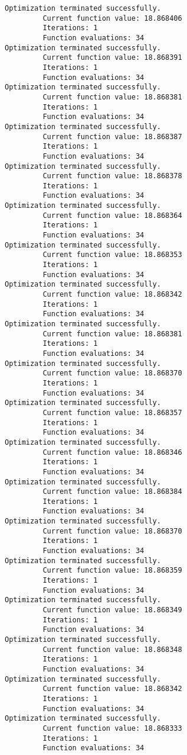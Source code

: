 \documentclass[11pt]{article}
\begin{document}
\begin{Verbatim}[commandchars=\\\{\}]
Optimization terminated successfully.
         Current function value: 18.868406
         Iterations: 1
         Function evaluations: 34
Optimization terminated successfully.
         Current function value: 18.868391
         Iterations: 1
         Function evaluations: 34
Optimization terminated successfully.
         Current function value: 18.868381
         Iterations: 1
         Function evaluations: 34
Optimization terminated successfully.
         Current function value: 18.868387
         Iterations: 1
         Function evaluations: 34
Optimization terminated successfully.
         Current function value: 18.868378
         Iterations: 1
         Function evaluations: 34
Optimization terminated successfully.
         Current function value: 18.868364
         Iterations: 1
         Function evaluations: 34
Optimization terminated successfully.
         Current function value: 18.868353
         Iterations: 1
         Function evaluations: 34
Optimization terminated successfully.
         Current function value: 18.868342
         Iterations: 1
         Function evaluations: 34
Optimization terminated successfully.
         Current function value: 18.868381
         Iterations: 1
         Function evaluations: 34
Optimization terminated successfully.
         Current function value: 18.868370
         Iterations: 1
         Function evaluations: 34
Optimization terminated successfully.
         Current function value: 18.868357
         Iterations: 1
         Function evaluations: 34
Optimization terminated successfully.
         Current function value: 18.868346
         Iterations: 1
         Function evaluations: 34
Optimization terminated successfully.
         Current function value: 18.868384
         Iterations: 1
         Function evaluations: 34
Optimization terminated successfully.
         Current function value: 18.868370
         Iterations: 1
         Function evaluations: 34
Optimization terminated successfully.
         Current function value: 18.868359
         Iterations: 1
         Function evaluations: 34
Optimization terminated successfully.
         Current function value: 18.868349
         Iterations: 1
         Function evaluations: 34
Optimization terminated successfully.
         Current function value: 18.868348
         Iterations: 1
         Function evaluations: 34
Optimization terminated successfully.
         Current function value: 18.868342
         Iterations: 1
         Function evaluations: 34
Optimization terminated successfully.
         Current function value: 18.868333
         Iterations: 1
         Function evaluations: 34

\end{Verbatim}
\end{document}
